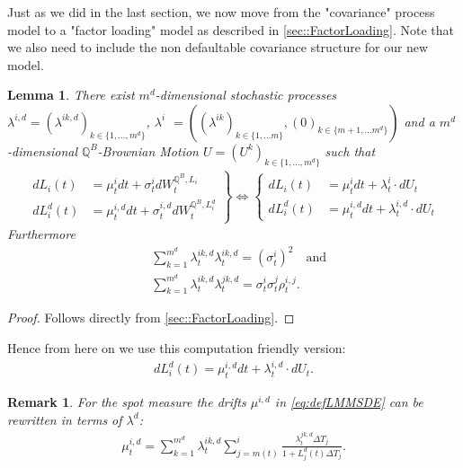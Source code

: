 \documentclass[12pt]{article}
\newtheorem{lemma}[theorem]{Lemma}
\newtheorem{remark}[theorem]{Remark}
\begin{document}
	Just as we did in the last section, we now move from the "covariance" process model to a "factor loading" model as described in \cref{sec::FactorLoading}. Note that we also need to include the non defaultable covariance structure for our new model.\\
	\begin{lemma}\label{lem:defLMMFactorVersion}
		There exist $m^d$-dimensional stochastic processes $\lambda^{i,d} = (\lambda^{i k, d})_{k \in \{1, ..., m^d\}}$, $\lambda^{i}$ $= ((\lambda^{i k})_{k \in \{1, ... m\}}, (0)_{k \in \{m+1, ... m^d\}})$ and a $m^d $-dimensional $\mathbb{Q}^B$-Brownian Motion $U=(U^k)_{k \in \{1,...,m^d\}}$ such that
		\begin{align*}
			\left.
			\begin{aligned}
				dL_i(t) &= \mu^{i}_t dt + \sigma^{i}_t dW^{\mathbb{Q}^B, L_i}_t\\
				dL^d_i(t) &= \mu^{i, d}_t dt + \sigma^{i, d}_t dW^{\mathbb{Q}^B, L^d_i}_t
			\end{aligned}
			\right\}
			 \iff 
			 \left\{
			 \begin{aligned}
			 	dL_i(t) &= \mu^{i}_t dt + \lambda^{i}_t\cdot dU_t\\
			 	dL^d_i(t) &= \mu^{i, d}_t dt + \lambda^{i,d}_t\cdot dU_t
			 \end{aligned}
			 \right.
		\end{align*}
		Furthermore
		\begin{align*}
			&\sum_{k=1}^{m^d}\lambda^{i k, d}_t \lambda^{i k, d}_t = (\sigma^i_t)^2 \quad\text{and}\\
			&\sum_{k=1}^{m^d}\lambda^{i k, d}_t \lambda^{j k, d}_t = \sigma^i_t \sigma^j_t \rho^{i,j}_t.
		\end{align*}
	\end{lemma}
	\begin{proof}
		Follows directly from \cref{sec::FactorLoading}.
	\end{proof}
	Hence from here on we use this computation friendly version:
	\begin{align}\label{eq:defLMMSDE}
			dL^d_i(t) = \mu^{i, d}_t dt + \lambda^{i,d}_t\cdot dU_t.
	\end{align}
	\begin{remark}\label{rem:defLMMDrift}
		For the spot measure the drifts $\mu^{i,d}$ in \cref{eq:defLMMSDE} can be rewritten in terms of $\lambda^{d}$:
		\begin{align*}
			\mu^{i,d}_t = \sum_{k=1}^{m^d}\lambda^{i k, d}_t \sum_{j=m(t)}^{i}\frac{\lambda^{j k, d}_t\Delta T_j}{1 + L^d_j(t)\Delta T_j}.
		\end{align*}
	\end{remark}
\end{document}
